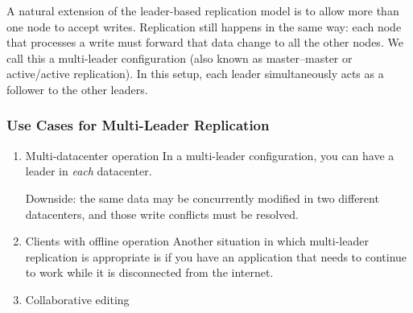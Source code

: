 \documentclass[11pt]{article}
\begin{document}
A natural extension of the leader-based replication model is to allow more than one node to
accept writes. Replication still happens in the same way: each node that processes a write must
forward that data change to all the other nodes. We call this a multi-leader configuration (also
known as master–master or active/active replication). In this setup, each leader simultaneously
acts as a follower to the other leaders.
\subsubsection{Use Cases for Multi-Leader Replication}
\label{sec:org74284d5}
\begin{enumerate}
\item Multi-datacenter operation
\label{sec:org3faeb4e}
In a multi-leader configuration, you can have a leader in \emph{each} datacenter.

Downside: the same data may be concurrently modified in two different datacenters, and those
write conflicts must be resolved.
\item Clients with offline operation
\label{sec:org9dfaacf}
Another situation in which multi-leader replication is appropriate is if you have an application
that needs to continue to work while it is disconnected from the internet.
\item Collaborative editing
\label{sec:org03b6609}
\end{enumerate}
\end{document}
